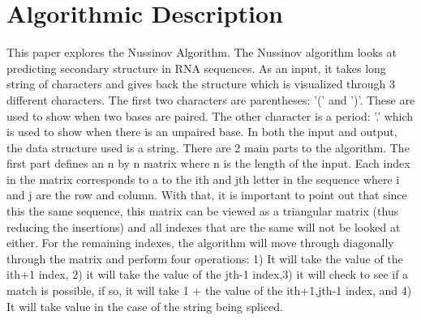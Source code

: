 \documentclass{article}
\begin{document}
\section*{Algorithmic Description}
This paper explores the Nussinov Algorithm. The Nussinov algorithm looks at predicting secondary structure in RNA sequences. As an input, it takes long string of characters and gives back the structure which is visualized  through 3 different characters. The first two characters are parentheses: '(' and ')'. These are used to show when two bases are paired. The other character is a period: '.' which is used to show when there is an unpaired base. In both the input and output, the data structure used is a string. There are 2 main parts to the algorithm. The first part defines an n by n matrix where n is the length of the input. Each index in the matrix corresponds to a to the ith and jth letter in the sequence where i and j are the row and column. With that, it is important to point out that since this the same sequence, this matrix can be viewed as a triangular matrix (thus reducing the insertions) and all indexes that are the same will not be looked at either. For the remaining indexes, the algorithm will move through diagonally through the matrix and perform four operations: 1) It will take the value of the ith+1 index, 2) it will take the value of the jth-1 index,3) it will check to see if a match is possible, if so, it will take 1 + the value of the ith+1,jth-1 index, and 4) It will take value in the case of the string being spliced. 
\end{document}
